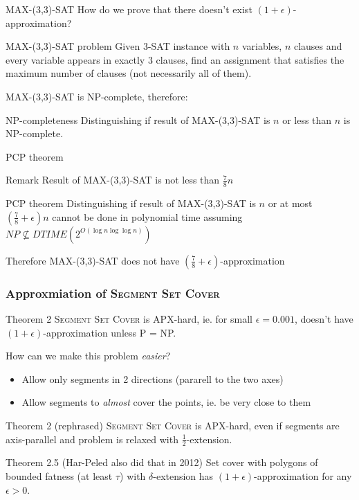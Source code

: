 \documentclass{beamer}
\begin{document}
\begin{frame}{\textsc{MAX-(3,3)-SAT}}
How do we prove that there doesn't exist $(1+\epsilon)$-approximation?


\begin{block}{\textsc{MAX-(3,3)-SAT} problem}
Given 3-SAT instance with $n$ variables, $n$ clauses
and every variable appears in exactly 3 clauses,
find an assignment
that satisfies the maximum number of clauses
(not necessarily all of them).
\end{block}

MAX-(3,3)-SAT is NP-complete, therefore:

\begin{block}{NP-completeness}
Distinguishing if result of MAX-(3,3)-SAT is
$n$ or less than $n$ is NP-complete.
\end{block}
\end{frame}

\begin{frame}{PCP theorem}
\begin{block}{Remark}
Result of MAX-(3,3)-SAT is not less than $\frac{7}{8}n$
\end{block}

\begin{block}{PCP theorem}
Distinguishing if result of MAX-(3,3)-SAT is $n$
or at most $(\frac{7}{8} + \epsilon)n$
cannot be done in polynomial time assuming $NP \nsubseteq DTIME(2^{O(\log n \log \log n)})$
\end{block}

Therefore MAX-(3,3)-SAT does not have
$(\frac{7}{8}+\epsilon)$-approximation
\end{frame}


\begin{frame}
\frametitle{Approxmiation of \textsc{Segment Set Cover}}
\begin{block}{Theorem 2}
	\textsc{Segment Set Cover} is APX-hard, ie.\newline
	for small $\epsilon =0.001$,
	doesn't have $(1+\epsilon)$-approximation unless P = NP.
\end{block}

How can we make this problem \textit{easier}?
\begin{itemize}
\item Allow only segments in 2 directions (pararell to the two axes)
\item Allow segments to \textit{almost} cover the points, ie. be very
close to them
\end{itemize}

\begin{block}{Theorem 2 (rephrased)}
	\textsc{Segment Set Cover} is APX-hard, even if segments are axis-parallel
	and problem is relaxed with $\frac{1}{2}$-extension.
\end{block}


\begin{block}{Theorem 2.5 (Har-Peled also did that in 2012)}
	Set cover with polygons of bounded fatness (at least $\tau$)
	 with $\delta$-extension has $(1+\epsilon)$-approximation
	 for any $\epsilon > 0$.
\end{block}

\end{frame}
\end{document}
